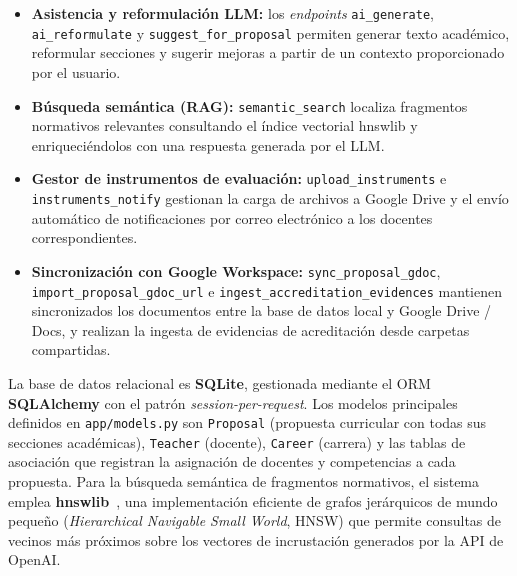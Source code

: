 \begin{description}
\begin{itemize}[leftmargin=1.5em, itemsep=2pt]
    \item \textbf{Asistencia y reformulación LLM:}
          los \textit{endpoints} \texttt{ai\_generate}, \texttt{ai\_reformulate}
          y \texttt{suggest\_for\_proposal} permiten generar texto acad\'emico,
          reformular secciones y sugerir mejoras a partir de un contexto
          proporcionado por el usuario.

    \item \textbf{Búsqueda semántica (RAG):}
          \texttt{semantic\_search} localiza fragmentos normativos relevantes
          consultando el índice vectorial hnswlib y enriqueciéndolos con una
          respuesta generada por el LLM.

    \item \textbf{Gestor de instrumentos de evaluación:}
          \texttt{upload\_instruments} e \texttt{instruments\_notify}
          gestionan la carga de archivos a Google Drive y el envío
          automático de notificaciones por correo electrónico a los docentes
          correspondientes.

    \item \textbf{Sincronización con Google Workspace:}
          \texttt{sync\_proposal\_gdoc}, \texttt{import\_proposal\_gdoc\_url}
          e \texttt{ingest\_accreditation\_evidences} mantienen
          sincronizados los documentos entre la base de datos local y
          Google Drive / Docs, y realizan la ingesta de evidencias de
          acreditación desde carpetas compartidas.
  \end{itemize}

  \item[\textbf{Capa de persistencia.}]
  La base de datos relacional es \textbf{SQLite}, gestionada mediante el ORM
  \textbf{SQLAlchemy} con el patrón \textit{session-per-request}.
  Los modelos principales definidos en \texttt{app/models.py} son
  \texttt{Proposal} (propuesta curricular con todas sus secciones
  académicas), \texttt{Teacher} (docente), \texttt{Career} (carrera) y las
  tablas de asociación que registran la asignación de docentes y
  competencias a cada propuesta.
  Para la búsqueda semántica de fragmentos normativos, el sistema emplea
  \textbf{hnswlib}~\cite{malkov2018efficient}, una implementación
  eficiente de grafos jerárquicos de mundo pequeño
  (\textit{Hierarchical Navigable Small World}, HNSW) que permite consultas
  de vecinos más próximos sobre los vectores de incrustación generados por
  la API de OpenAI.

\end{description}

